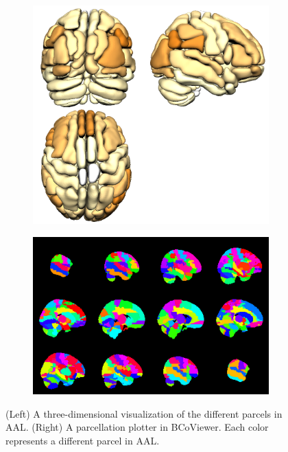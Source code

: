 \documentclass{nature}
\begin{document}
\begin{figure}
\centering
\begin{subfigure}{.5\textwidth}
  \centering
  \includegraphics[width=.9\linewidth]{fig/brainconductor/AAL_all.png}
\end{subfigure}%
\begin{subfigure}{.5\textwidth}
  \centering
 
\includegraphics[width=.9\linewidth]{fig/brainconductor/partition_aal_sagittal_2016-04-11.png}
\end{subfigure}
\caption{(Left) A three-dimensional visualization of the different parcels in
AAL. (Right) A parcellation plotter in BCoViewer. Each color represents a
different parcel in AAL.}
\label{fig:aal}

\end{figure}
\end{document}
